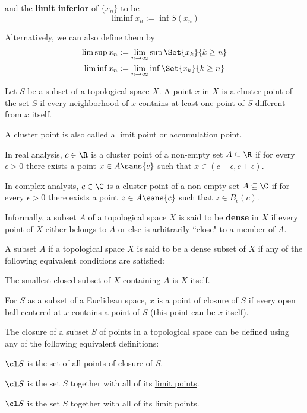 and the \textbf{limit inferior} of $\{x_n\}$ to be
$$
  \liminf x_n := \inf S(x_n)
$$

Alternatively, we can also define them by
\begin{align*}
  \limsup x_n & := \lim_{n\to\infty}\sup\Set{x_k}{k\geq n} \\
  \liminf x_n & := \lim_{n\to\infty}\inf\Set{x_k}{k\geq n}
\end{align*}

\label{b0219cd}

Let $S$ be a subset of a topological space $X$. A point $x$ in $X$ is a cluster
point of the set $S$ if every neighborhood of $x$ contains at least one point
of $S$ different from $x$ itself.

A cluster point is also called a limit point or accumulation point.

In real analysis, $c\in\R$ is a cluster point of a non-empty set $A\subseteq\R$
if for every $\epsilon>0$ there exists a point $x\in A\sans{c}$ such that
$x\in(c-\epsilon,c+\epsilon)$.

In complex analysis, $c\in\C$ is a cluster point of a non-empty set
$A\subseteq\C$ if for every $\epsilon>0$ there exists a point $z\in A\sans{c}$
such that $z\in B_\epsilon(c)$.

\label{e14819a}

Informally, a subset $A$ of a topological space $X$ is said to be
\textbf{dense} in $X$ if every point of $X$ either belongs to $A$ or else is
arbitrarily ``close" to a member of $A$.

A subset $A$ if a topological space $X$ is said to be a dense subset of $X$ if
any of the following equivalent conditions are satisfied:
\begin{enumerati}
  \item The smallest closed subset of $X$ containing $A$ is $X$ itself.
\end{enumerati}

\label{f928932}

For $S$ as a subset of a Euclidean space, $x$ is a point of closure of $S$ if
every open ball centered at $x$ contains a point of $S$ (this point can be $x$
itself).

\label{a07ff74}

The closure of a subset $S$ of points in a topological space can be defined
using any of the following equivalent definitions:
\begin{enumerati}
  \item $\cl S$ is the set of all \href{f928932}{points of closure} of $S$.
  \item $\cl S$ is the set $S$ together with all of its \href{f928932}{limit
  points}.
  \item $\cl S$ is the set $S$ together with all of its limit points.
\end{enumerati}

